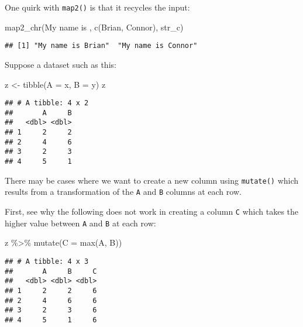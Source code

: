 \documentclass[
]{book}
\newenvironment{Shaded}{\begin{snugshade}}{\end{snugshade}}
\newcommand{\AttributeTok}[1]{\textcolor[rgb]{0.77,0.63,0.00}{#1}}
\newcommand{\FunctionTok}[1]{\textcolor[rgb]{0.00,0.00,0.00}{#1}}
\newcommand{\NormalTok}[1]{#1}
\newcommand{\OtherTok}[1]{\textcolor[rgb]{0.56,0.35,0.01}{#1}}
\newcommand{\SpecialCharTok}[1]{\textcolor[rgb]{0.00,0.00,0.00}{#1}}
\newcommand{\StringTok}[1]{\textcolor[rgb]{0.31,0.60,0.02}{#1}}
\begin{document}
One quirk with \texttt{map2()} is that it recycles the input:

\begin{Shaded}
\begin{Highlighting}[]
\FunctionTok{map2\_chr}\NormalTok{(}\StringTok{\textquotesingle{}My name is \textquotesingle{}}\NormalTok{, }\FunctionTok{c}\NormalTok{(}\StringTok{\textquotesingle{}Brian\textquotesingle{}}\NormalTok{, }\StringTok{\textquotesingle{}Connor\textquotesingle{}}\NormalTok{), str\_c)}
\end{Highlighting}
\end{Shaded}

\begin{verbatim}
## [1] "My name is Brian"  "My name is Connor"
\end{verbatim}

Suppose a dataset such as this:

\begin{Shaded}
\begin{Highlighting}[]
\NormalTok{z }\OtherTok{\textless{}{-}} \FunctionTok{tibble}\NormalTok{(}\AttributeTok{A =}\NormalTok{ x, }\AttributeTok{B =}\NormalTok{ y)}
\NormalTok{z}
\end{Highlighting}
\end{Shaded}

\begin{verbatim}
## # A tibble: 4 x 2
##       A     B
##   <dbl> <dbl>
## 1     2     2
## 2     4     6
## 3     2     3
## 4     5     1
\end{verbatim}

There may be cases where we want to create a new column using \texttt{mutate()} which results from a transformation of the \texttt{A} and \texttt{B} columns at each row.

First, see why the following does not work in creating a column \texttt{C} which takes the higher value between \texttt{A} and \texttt{B} at each row:

\begin{Shaded}
\begin{Highlighting}[]
\NormalTok{z }\SpecialCharTok{\%\textgreater{}\%} \FunctionTok{mutate}\NormalTok{(}\AttributeTok{C =} \FunctionTok{max}\NormalTok{(A, B))}
\end{Highlighting}
\end{Shaded}

\begin{verbatim}
## # A tibble: 4 x 3
##       A     B     C
##   <dbl> <dbl> <dbl>
## 1     2     2     6
## 2     4     6     6
## 3     2     3     6
## 4     5     1     6
\end{verbatim}
\end{document}
